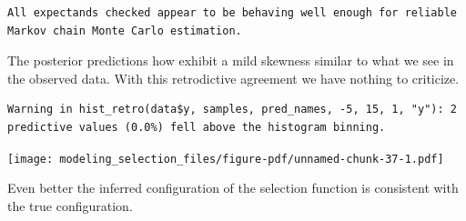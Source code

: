 \documentclass[
  letterpaper,
  DIV=11,
  numbers=noendperiod]{scrartcl}
\newenvironment{Shaded}{\begin{snugshade}}{\end{snugshade}}
\newcommand{\AttributeTok}[1]{\textcolor[rgb]{0.40,0.45,0.13}{#1}}
\newcommand{\ConstantTok}[1]{\textcolor[rgb]{0.56,0.35,0.01}{#1}}
\newcommand{\DecValTok}[1]{\textcolor[rgb]{0.68,0.00,0.00}{#1}}
\newcommand{\FunctionTok}[1]{\textcolor[rgb]{0.28,0.35,0.67}{#1}}
\newcommand{\NormalTok}[1]{\textcolor[rgb]{0.00,0.23,0.31}{#1}}
\newcommand{\OtherTok}[1]{\textcolor[rgb]{0.00,0.23,0.31}{#1}}
\newcommand{\SpecialCharTok}[1]{\textcolor[rgb]{0.37,0.37,0.37}{#1}}
\newcommand{\StringTok}[1]{\textcolor[rgb]{0.13,0.47,0.30}{#1}}
\begin{document}
\begin{verbatim}
All expectands checked appear to be behaving well enough for reliable
Markov chain Monte Carlo estimation.
\end{verbatim}

The posterior predictions how exhibit a mild skewness similar to what we
see in the observed data. With this retrodictive agreement we have
nothing to criticize.

\begin{Shaded}
\end{Shaded}

\begin{verbatim}
Warning in hist_retro(data$y, samples, pred_names, -5, 15, 1, "y"): 2
predictive values (0.0%) fell above the histogram binning.
\end{verbatim}

\texttt{[image: modeling\_selection\_files/figure-pdf/unnamed-chunk-37-1.pdf]}

Even better the inferred configuration of the selection function is
consistent with the true configuration.
\end{document}
